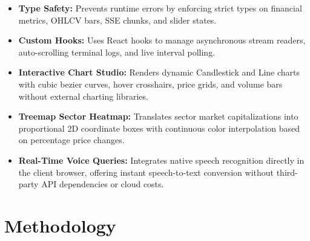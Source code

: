 \documentclass[12pt,a4paper]{report}
\begin{document}
\begin{techbox}[title=React 18 with TypeScript]
\begin{itemize}[leftmargin=*]
  \item \textbf{Type Safety:} Prevents runtime errors by enforcing strict types on financial metrics, OHLCV bars, SSE chunks, and slider states.
  \item \textbf{Custom Hooks:} Uses React hooks to manage asynchronous stream readers, auto-scrolling terminal logs, and live interval polling.
\end{itemize}
\end{techbox}

\vspace{0.4cm}

\begin{techbox}[title=Zero-Dependency Custom SVG Graphics]
\begin{itemize}[leftmargin=*]
  \item \textbf{Interactive Chart Studio:} Renders dynamic Candlestick and Line charts with cubic bezier curves, hover crosshairs, price grids, and volume bars without external charting libraries.
  \item \textbf{Treemap Sector Heatmap:} Translates sector market capitalizations into proportional 2D coordinate boxes with continuous color interpolation based on percentage price changes.
\end{itemize}
\end{techbox}

\vspace{0.4cm}

\begin{techbox}[title=Web Speech API (Browser Native)]
\begin{itemize}[leftmargin=*]
  \item \textbf{Real-Time Voice Queries:} Integrates native speech recognition directly in the client browser, offering instant speech-to-text conversion without third-party API dependencies or cloud costs.
\end{itemize}
\end{techbox}

\clearpage
\chapter{Methodology}
\end{document}
